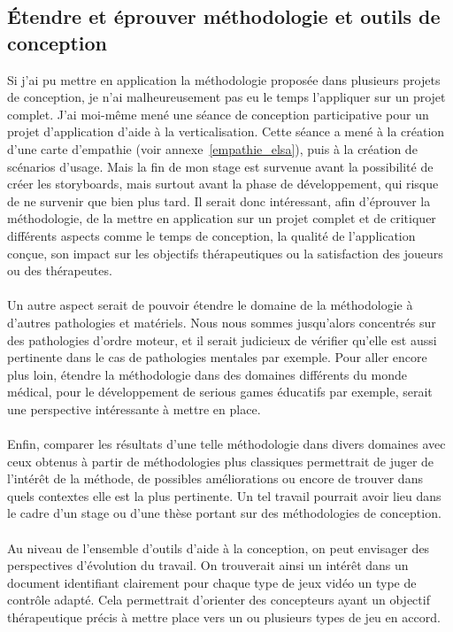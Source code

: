 	\subsection{Étendre et éprouver méthodologie et outils de conception}
Si j'ai pu mettre en application la méthodologie proposée dans plusieurs projets de conception, je n'ai malheureusement pas eu le temps l'appliquer sur un projet complet. J'ai  moi-même mené une séance de conception participative pour un projet d'application d'aide à la verticalisation. Cette séance a mené à la création d'une carte d'empathie (voir annexe~\ref{empathie_elsa}), puis à la création de scénarios d'usage. Mais la fin de mon stage est survenue avant la possibilité de créer les storyboards, mais surtout avant la phase de développement, qui risque de ne survenir que bien plus tard. Il serait donc intéressant, afin d'éprouver la méthodologie, de la mettre en application sur un projet complet et de critiquer différents aspects comme le temps de conception, la qualité de l'application conçue, son impact sur les objectifs thérapeutiques ou la satisfaction des joueurs ou des thérapeutes.

\paragraph{}
Un autre aspect serait de pouvoir étendre le domaine de la méthodologie à d'autres pathologies et matériels. Nous nous sommes jusqu'alors concentrés sur des pathologies d'ordre moteur, et il serait judicieux de vérifier qu'elle est aussi pertinente dans le cas de pathologies mentales par exemple. Pour aller encore plus loin, étendre la méthodologie dans des domaines différents du monde médical, pour le développement de serious games éducatifs par exemple, serait une perspective intéressante à mettre en place.

\paragraph{} Enfin, comparer les résultats d'une telle méthodologie dans divers domaines avec ceux obtenus à partir de méthodologies plus classiques permettrait de juger de l'intérêt de la méthode, de possibles améliorations ou encore de trouver dans quels contextes elle est la plus pertinente. Un tel travail pourrait avoir lieu dans le cadre d'un stage ou d'une thèse portant sur des méthodologies de conception.

\paragraph{} Au niveau de l'ensemble d'outils d'aide à la conception, on peut envisager des perspectives d'évolution du travail. On trouverait ainsi un intérêt dans un document identifiant clairement pour chaque type de jeux vidéo un type de contrôle adapté. Cela permettrait d'orienter des concepteurs ayant un objectif thérapeutique précis à mettre place vers un ou plusieurs types de jeu en accord.

